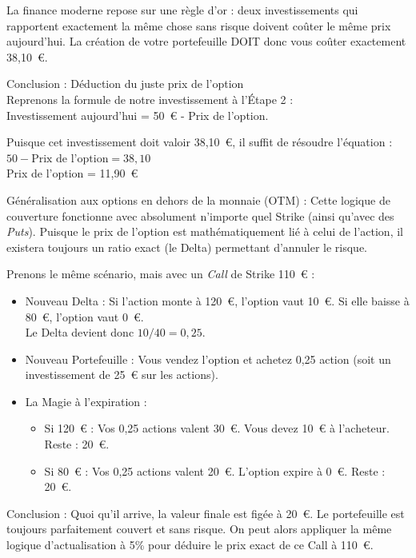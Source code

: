 La finance moderne repose sur une règle d'or : deux investissements qui rapportent exactement la même chose sans risque doivent coûter le même prix aujourd'hui. La création de votre portefeuille DOIT donc vous coûter exactement 38,10~€.

\vspace{0.4cm}
Conclusion : Déduction du juste prix de l'option\\
Reprenons la formule de notre investissement à l'Étape 2 : \\
Investissement aujourd'hui = 50~€ - Prix de l'option.

Puisque cet investissement doit valoir 38,10~€, il suffit de résoudre l'équation :\\
$50 - \text{Prix de l'option} = 38,10$ \\
Prix de l'option = 11,90~€

\vspace{0.4cm}
Généralisation aux options en dehors de la monnaie (OTM) :
Cette logique de couverture fonctionne avec absolument n'importe quel Strike (ainsi qu'avec des \textit{Puts}). Puisque le prix de l'option est mathématiquement lié à celui de l'action, il existera toujours un ratio exact (le Delta) permettant d'annuler le risque.

Prenons le même scénario, mais avec un \textit{Call} de Strike 110~€ :
\begin{itemize}[label=$\rightarrow$]
    \item Nouveau Delta : Si l'action monte à 120~€, l'option vaut 10~€. Si elle baisse à 80~€, l'option vaut 0~€. \\
    Le Delta devient donc $10 / 40 = 0,25$.
    \item Nouveau Portefeuille : Vous vendez l'option et achetez 0,25 action (soit un investissement de 25~€ sur les actions).
    \item La Magie à l'expiration : 
    \begin{itemize}[label=$\cdot$]
        \item Si 120~€ : Vos 0,25 actions valent 30~€. Vous devez 10~€ à l'acheteur. Reste : 20~€.
        \item Si 80~€ : Vos 0,25 actions valent 20~€. L'option expire à 0~€. Reste : 20~€.
    \end{itemize}
\end{itemize}
Conclusion : Quoi qu'il arrive, la valeur finale est figée à 20~€. Le portefeuille est toujours parfaitement couvert et sans risque. On peut alors appliquer la même logique d'actualisation à 5\% pour déduire le prix exact de ce Call à 110~€.


